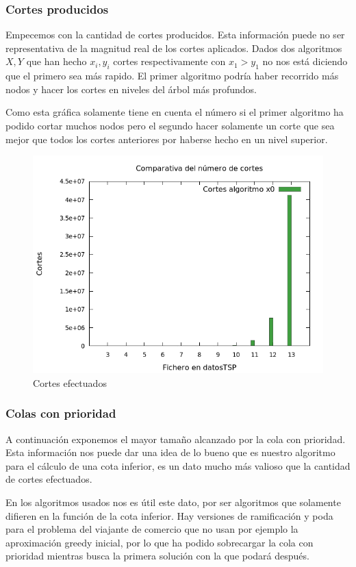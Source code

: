 \subsubsection{Cortes producidos}
Empecemos con la cantidad de cortes producidos. Esta información puede no ser representativa de la
magnitud real de los cortes aplicados. Dados dos algoritmos $X,Y$ que han hecho $x_i,y_i$ cortes
respectivamente con $x_1>y_1$ no nos está diciendo que el primero sea más rapido.
El primer algoritmo podría haber recorrido más nodos y hacer los cortes en niveles del árbol más profundos. 

Como esta gráfica solamente tiene en cuenta el número si el primer algoritmo ha podido 
cortar muchos nodos pero el segundo hacer solamente un corte que sea mejor que todos los cortes
anteriores por haberse hecho en un nivel superior.
 
\begin{figure}[H]
    \centering
    \includegraphics[scale=0.65]{../TSP/Graficas/graficaCortes.png}
    \caption{Cortes efectuados}
\end{figure}


\subsubsection{Colas con prioridad}
A continuación exponemos el mayor tamaño alcanzado por la cola con prioridad.
Esta información nos puede dar una idea de lo bueno que es nuestro algoritmo para el cálculo
de una cota inferior, es un dato mucho más valioso que la cantidad de cortes efectuados.

En los algoritmos usados nos es útil este dato, por ser algoritmos que solamente difieren en
la función de la cota inferior. Hay versiones de ramificación y poda para el problema del viajante
de comercio que no usan por ejemplo la aproximación greedy inicial, por lo que ha podido 
sobrecargar la cola con prioridad mientras busca la primera solución con la que podará después.

